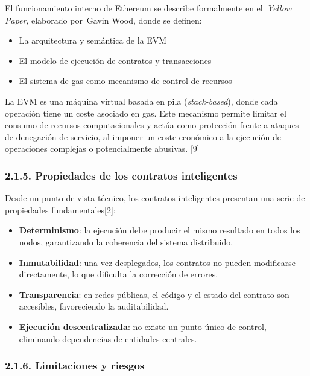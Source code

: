 El funcionamiento interno de Ethereum se describe formalmente en
el~\emph{Yellow Paper}, elaborado por~Gavin Wood, donde se definen:

\begin{itemize}
\tightlist
\item
  La arquitectura y semántica de la EVM
\item
  El modelo de ejecución de contratos y transacciones
\item
  El sistema de gas como mecanismo de control de recursos
\end{itemize}

La EVM es una máquina virtual basada en pila (\emph{stack-based}), donde
cada operación tiene un coste asociado en gas. Este mecanismo permite
limitar el consumo de recursos computacionales y actúa como protección
frente a ataques de denegación de servicio, al imponer un coste
económico a la ejecución de operaciones complejas o potencialmente
abusivas. {[}9{]}

\subsubsection{2.1.5. Propiedades de los contratos
inteligentes}\label{propiedades-de-los-contratos-inteligentes}

Desde un punto de vista técnico, los contratos inteligentes presentan
una serie de propiedades fundamentales{[}2{]}:

\begin{itemize}
\tightlist
\item
  \textbf{Determinismo}: la ejecución debe producir el mismo resultado
  en todos los nodos, garantizando la coherencia del sistema
  distribuido.
\item
  \textbf{Inmutabilidad}: una vez desplegados, los contratos no pueden
  modificarse directamente, lo que dificulta la corrección de errores.
\item
  \textbf{Transparencia}: en redes públicas, el código y el estado del
  contrato son accesibles, favoreciendo la auditabilidad.
\item
  \textbf{Ejecución descentralizada}: no existe un punto único de
  control, eliminando dependencias de entidades centrales.
\end{itemize}

\subsubsection{2.1.6. Limitaciones y
riesgos}\label{limitaciones-y-riesgos}

